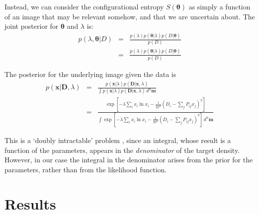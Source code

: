 \documentclass[entropy,article,submit,moreauthors,pdftex,10pt,a4paper]{Definitions/mdpi}
\newcommand{\xx}{\boldsymbol{\theta}}
\newcommand{\data}{D}
\begin{document}
Instead, we can consider the configurational
entropy $S(\xx)$ as simply a function of an image that may
be relevant somehow, and that we are uncertain about. The joint posterior
for $\xx$ and $\lambda$ is:
\begin{eqnarray}
p(\lambda, \xx | \data) &=&
\frac{p(\lambda)p(\xx | \lambda)p(\data | \xx)}
{p(\data)}\\
&=&
\frac{p(\lambda)p(\xx | \lambda)p(\data | \xx)}
{p(\data)}
\end{eqnarray}


The posterior for the underlying image given the data is
\begin{eqnarray}
p(\boldsymbol{x} | \boldsymbol{D}, \lambda)
&=& \frac{p(\boldsymbol{x} | \lambda)p(\boldsymbol{D}|\boldsymbol{x}, \lambda)}
{\int p(\boldsymbol{x}|\lambda)p(\boldsymbol{D}|\boldsymbol{x}, \lambda) \,d^n\boldsymbol{m}}\\
&=& \frac{\exp\left[-\lambda \sum_i x_i\ln x_i
-\frac{1}{2\sigma^2}\left(D_i - \sum_{j} P_{ij}x_{j}\right)^2\right]}
{\int \exp\left[-\lambda \sum_i x_i\ln x_i
-\frac{1}{2\sigma^2}\left(D_i - \sum_{j} P_{ij}x_{j}\right)^2\right]\, d^n\boldsymbol{m}}
\end{eqnarray}

This is a `doubly intractable' problem \citep{murray}, since an integral, whose
result is a function of the parameters, appears in the {\em denominator} of the
target density. However, in our case the integral in the
denominator arises from the prior for the parameters, rather than from the
likelihood function.

% 
\section{Results}
\end{document}
